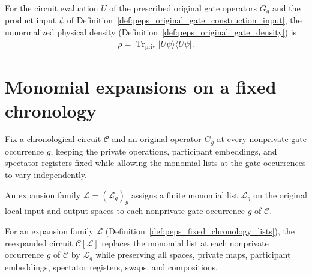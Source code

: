 \begin{definition}
    \label{def:peps_original_gate_construction_density}
    \leanok
    For the circuit evaluation $U$ of the prescribed original gate operators $G_g$ and the product input $\psi$ of Definition~\ref{def:peps_original_gate_construction_input}, the unnormalized physical density (Definition~\ref{def:peps_original_gate_density}) is
    \begin{align}
        \rho=\operatorname{Tr}_{\mathrm{priv}}\lvert U\psi\rangle\langle U\psi\rvert.
    \end{align}
\end{definition}

\section{Monomial expansions on a fixed chronology}
\label{sec:peps_fixed_chronology_expansions}

Fix a chronological circuit $\mathcal C$ and an original operator $G_g$
at every nonprivate gate occurrence $g$, keeping the private operations,
participant embeddings, and spectator registers fixed while allowing the
monomial lists at the gate occurrences to vary independently.

\begin{definition}
    \label{def:peps_fixed_chronology_lists}
    \leanok
    An expansion family $\mathcal L=(\mathcal L_g)_g$ assigns a finite monomial list $\mathcal L_g$ on the original local input and output spaces to each nonprivate gate occurrence $g$ of $\mathcal C$.
\end{definition}

\begin{definition}
    \label{def:peps_fixed_chronology_reexpansion}
    \leanok
    For an expansion family $\mathcal L$ (Definition~\ref{def:peps_fixed_chronology_lists}), the reexpanded circuit $\mathcal C[\mathcal L]$ replaces the monomial list at each nonprivate occurrence $g$ of $\mathcal C$ by $\mathcal L_g$ while preserving all spaces, private maps, participant embeddings, spectator registers, swaps, and compositions.
\end{definition}


